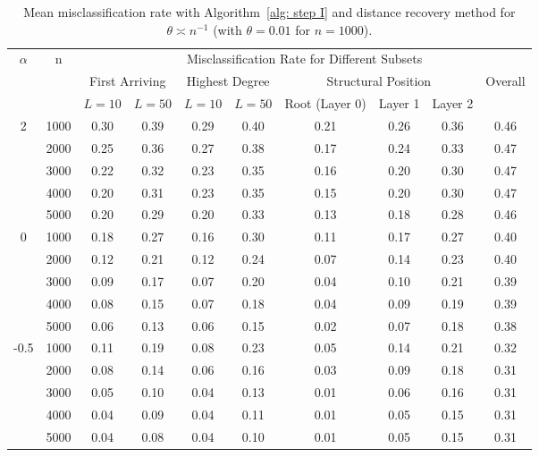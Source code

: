 \documentclass[twoside,11pt]{article}
\theoremstyle{remark}
\begin{document}
\begin{table}[tbp]
\setlength{\tabcolsep}{3.5pt}

\centering
\small

{
\begin{tabular}{c|c|cc|cc|ccc|c}
\hline
\hline
\multirow{3}{*}{$\alpha$} & \multirow{3}{*}{n}
& \multicolumn{8}{c}{Misclassification Rate for Different Subsets} \\
\cline{3-10}
& 
& \multicolumn{2}{c|}{First Arriving}
& \multicolumn{2}{c|}{Highest Degree}
& \multicolumn{3}{c|}{Structural Position}
& \multirow{2}{*}{Overall} \\
\cline{3-9}
& 
& $L=10$ & $L=50$
& $L=10$ & $L=50$
& Root (Layer 0) & Layer 1 & Layer 2
& \\
\hline
\multirow{5}{*}{2}
& 1000 & 0.30 & 0.39 & 0.29 & 0.40 & 0.21 & 0.26 & 0.36 & 0.46 \\
& 2000 & 0.25 & 0.36 & 0.27 & 0.38 & 0.17 & 0.24 & 0.33 & 0.47 \\
& 3000 & 0.22 & 0.32 & 0.23 & 0.35 & 0.16 & 0.20 & 0.30 & 0.47 \\
& 4000 & 0.20 & 0.31 & 0.23 & 0.35 & 0.15 & 0.20 & 0.30 & 0.47 \\
& 5000 & 0.20 & 0.29 & 0.20 & 0.33 & 0.13 & 0.18 & 0.28 & 0.46 \\
\hline
\multirow{5}{*}{0}
& 1000 & 0.18 & 0.27 & 0.16 & 0.30 & 0.11 & 0.17 & 0.27 & 0.40 \\
& 2000 & 0.12 & 0.21 & 0.12 & 0.24 & 0.07 & 0.14 & 0.23 & 0.40 \\
& 3000 & 0.09 & 0.17 & 0.07 & 0.20 & 0.04 & 0.10 & 0.21 & 0.39 \\
& 4000 & 0.08 & 0.15 & 0.07 & 0.18 & 0.04 & 0.09 & 0.19 & 0.39 \\
& 5000 & 0.06 & 0.13 & 0.06 & 0.15 & 0.02 & 0.07 & 0.18 & 0.38 \\
\hline
\multirow{5}{*}{-0.5}
& 1000 & 0.11 & 0.19 & 0.08 & 0.23 & 0.05 & 0.14 & 0.21 & 0.32 \\
& 2000 & 0.08 & 0.14 & 0.06 & 0.16 & 0.03 & 0.09 & 0.18 & 0.31 \\
& 3000 & 0.05 & 0.10 & 0.04 & 0.13 & 0.01 & 0.06 & 0.16 & 0.31 \\
& 4000 & 0.04 & 0.09 & 0.04 & 0.11 & 0.01 & 0.05 & 0.15 & 0.31 \\
& 5000 & 0.04 & 0.08 & 0.04 & 0.10 & 0.01 & 0.05 & 0.15 & 0.31 \\
\hline
\hline
\end{tabular}
}


\caption{Mean misclassification rate with Algorithm~\ref{alg: step I} and distance recovery method for $\theta \asymp n^{-1}$ (with $\theta=0.01$ for $n=1000$).}
\label{tab:mean_error_scale_n1}
\end{table}
\end{document}
